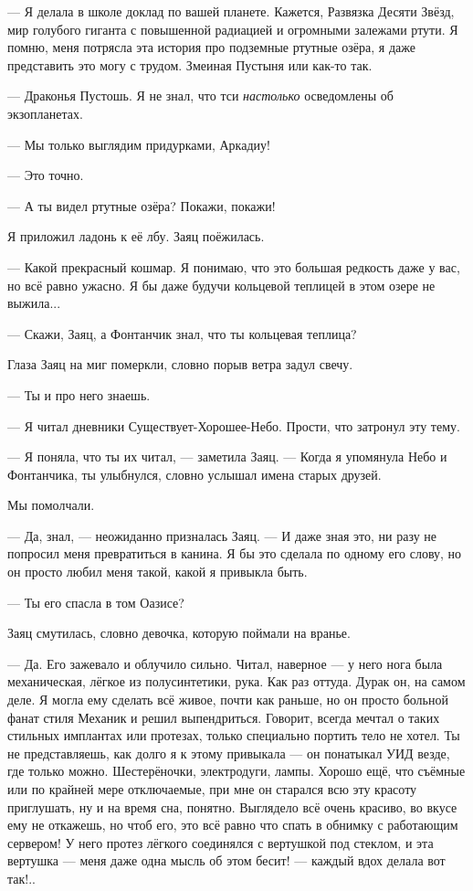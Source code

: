 --- Я делала в школе доклад по вашей планете.
Кажется, Развязка Десяти Звёзд, мир голубого гиганта с повышенной радиацией и огромными залежами ртути.
Я помню, меня потрясла эта история про подземные ртутные озёра, я даже представить это могу с трудом.
Змеиная Пустыня или как-то так.

--- Драконья Пустошь.
Я не знал, что тси \emph{настолько} осведомлены об экзопланетах.

--- Мы только выглядим придурками, Аркадиу!

--- Это точно.

--- А ты видел ртутные озёра?
Покажи, покажи!

Я приложил ладонь к её лбу.
Заяц поёжилась.

--- Какой прекрасный кошмар.
Я понимаю, что это большая редкость даже у вас, но всё равно ужасно.
Я бы даже будучи кольцевой теплицей в этом озере не выжила...

--- Скажи, Заяц, а Фонтанчик знал, что ты кольцевая теплица?

Глаза Заяц на миг померкли, словно порыв ветра задул свечу.

--- Ты и про него знаешь.

--- Я читал дневники Существует-Хорошее-Небо.
Прости, что затронул эту тему.

--- Я поняла, что ты их читал, --- заметила Заяц.
--- Когда я упомянула Небо и Фонтанчика, ты улыбнулся, словно услышал имена старых друзей.

Мы помолчали.

--- Да, знал, --- неожиданно призналась Заяц.
--- И даже зная это, ни разу не попросил меня превратиться в канина.
Я бы это сделала по одному его слову, но он просто любил меня такой, какой я привыкла быть.

--- Ты его спасла в том Оазисе?

Заяц смутилась, словно девочка, которую поймали на вранье.

--- Да.
Его зажевало и облучило сильно.
Читал, наверное --- у него нога была механическая, лёгкое из полусинтетики, рука.
Как раз оттуда.
Дурак он, на самом деле.
Я могла ему сделать всё живое, почти как раньше, но он просто больной фанат стиля Механик и решил выпендриться.
Говорит, всегда мечтал о таких стильных имплантах или протезах, только специально портить тело не хотел.
Ты не представляешь, как долго я к этому привыкала --- он понатыкал УИД везде, где только можно.
Шестерёночки, электродуги, лампы.
Хорошо ещё, что съёмные или по крайней мере отключаемые, при мне он старался всю эту красоту приглушать, ну и на время сна, понятно.
Выглядело всё очень красиво, во вкусе ему не откажешь, но чтоб его, это всё равно что спать в обнимку с работающим сервером!
У него протез лёгкого соединялся с вертушкой под стеклом, и эта вертушка --- меня даже одна мысль об этом бесит! --- каждый вдох делала вот так!..


